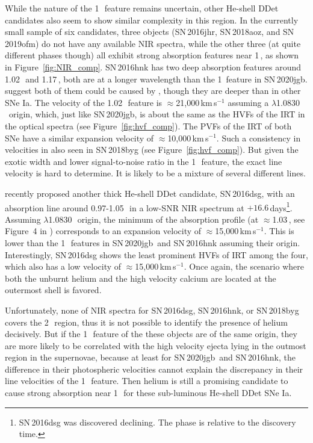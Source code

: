 \documentclass[twocolumn]{aastex631}
\newcommand{\sn}{SN\,2020jgb}
\begin{document}
While the nature of the 1\,\micron\ feature remains uncertain, other He-shell DDet candidates also seem to show similar complexity in this region. In the currently small sample of six candidates, three objects (SN\,2016jhr, SN\,2018aoz, and SN\,2019ofm) do not have any available NIR spectra, while the other three (at quite different phases though) all exhibit strong absorption features near 1\,\micron, as shown in Figure~\ref{fig:NIR_comp}. SN\,2016hnk has two deep absorption features around 1.02\,\micron\ and 1.17\,\micron, both are at a longer wavelength than the 1\micron\ feature in \sn. \citet{galbany_16hnk_2019} suggest both of them could be caused by , though they are deeper than in other SNe Ia. The velocity of the 1.02\,\micron\ feature is $\approx$21,000\,km\,s$^{-1}$ assuming a  $\lambda$1.0830\,\micron\ origin, which, just like \sn, is about the same as the HVFs of the  IRT in the optical spectra (see Figure~\ref{fig:hvf_comp}). The PVFs of the  IRT of both SNe have a similar expansion velocity of $\approx$10,000\,km\,s$^{-1}$. Such a consistency in velocities in also seen in SN\,2018byg (see Figure~\ref{fig:hvf_comp}). But given the exotic width and lower signal-to-noise ratio in the 1\,\micron\ feature, the exact line velocity is hard to determine. It is likely to be a mixture of several different lines. 

\citet{Dong_16dsg_2022} recently proposed another thick He-shell DDet candidate, SN\,2016dsg, with an absorption line around 0.97-1.05\,\micron\ in a low-SNR NIR spectrum at $+16.6$\,days\footnote{SN\,2016dsg was discovered declining. The phase is relative to the discovery time.}. Assuming  $\lambda$1.0830\,\micron\ origin, the minimum of the absorption profile (at $\approx$1.03\,\micron, see Figure~4 in \citealp{Dong_16dsg_2022}) corresponds to an expansion velocity of $\approx$15,000\,km\,s$^{-1}$. This is lower than the 1\,\micron\ features in \sn\ and SN\,2016hnk assuming their  origin. Interestingly, SN\,2016dsg shows the least prominent HVFs of  IRT among the four, which also has a low velocity of $\approx$15,000\,km\,s$^{-1}$. Once again, the scenario where both the unburnt helium and the high velocity calcium are located at the outermost shell is favored.

Unfortunately, none of NIR spectra for SN\,2016dsg, SN\,2016hnk, or SN\,2018byg covers the 2\,\micron\ region, thus it is not possible to identify the presence of helium decisively. But if the 1\,\micron\ feature of the these objects are of the same origin, they are more likely to be correlated with the high velocity ejecta lying in the outmost region in the supernovae, because at least for \sn\ and SN\,2016hnk, the difference in their photospheric velocities cannot explain the discrepancy in their line velocities of the 1\,\micron\ feature. Then helium is still a promising candidate to cause strong absorption near 1\,\micron\ for these sub-luminous He-shell DDet SNe Ia. 
\end{document}
